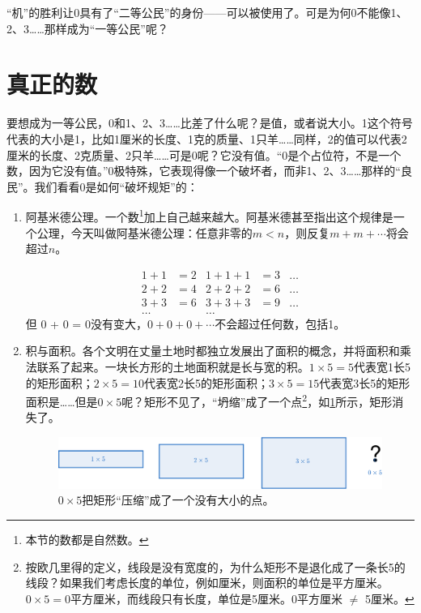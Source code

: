 \documentclass[b5paper]{ctexart}
\begin{document}
“机”的胜利让0具有了“二等公民”的身份——可以被使用了。可是为何0不能像1、2、3……那样成为“一等公民”呢？

\section{真正的数}

要想成为一等公民，0和1、2、3……比差了什么呢？是值，或者说大小。1这个符号代表的大小是1，比如1厘米的长度、1克的质量、1只羊……同样，2的值可以代表2厘米的长度、2克质量、2只羊……可是0呢？它没有值。“0是个占位符，不是一个数，因为它没有值\cite{Seife-2000}。”0极特殊，它表现得像一个破坏者，而非1、2、3……那样的“良民”。我们看看0是如何“破坏规矩”的：

\begin{enumerate}[1)]
\item 阿基米德公理。一个数\footnote{本节的数都是自然数。}加上自己越来越大。阿基米德甚至指出这个规律是一个公理，今天叫做阿基米德公理：任意非零的$m < n$，则反复$m + m + \cdots$将会超过$n$。 

\begin{align*}
1 + 1 &= 2   & 1 + 1 + 1 &= 3 & \dots \\
2 + 2 &= 4   & 2 + 2 + 2 &= 6 & \dots \\
3 + 3 &= 6   & 3 + 3 + 3 &= 9 & \dots \\
\dots &      & \dots     &    &
\end{align*}
但 0 + 0 = 0没有变大，$0 + 0 + 0 + \cdots$不会超过任何数，包括1。

\item 积与面积。各个文明在丈量土地时都独立发展出了面积的概念，并将面积和乘法联系了起来。一块长方形的土地面积就是长与宽的积。$1 \times 5 = 5$代表宽1长5的矩形面积；$2 \times 5 = 10$代表宽2长5的矩形面积；$3 \times 5 = 15$代表宽3长5的矩形面积是……但是$0 \times 5$呢？矩形不见了，“坍缩”成了一个点\footnote{按欧几里得的定义，线段是没有宽度的，为什么矩形不是退化成了一条长5的线段？如果我们考虑长度的单位，例如厘米，则面积的单位是平方厘米。$0 \times 5 = 0$平方厘米，而线段只有长度，单位是5厘米。0平方厘米 $\neq$ 5厘米。}，如\cref{fig:rectangle-vanish}所示，矩形消失了。

\begin{figure}[htbp]
 \centering
 \includegraphics[scale=0.6]{img/rectangles}
 \caption{$0 \times 5$把矩形“压缩”成了一个没有大小的点。}
 \label{fig:rectangle-vanish}
\end{figure}


\end{enumerate}
\end{document}
